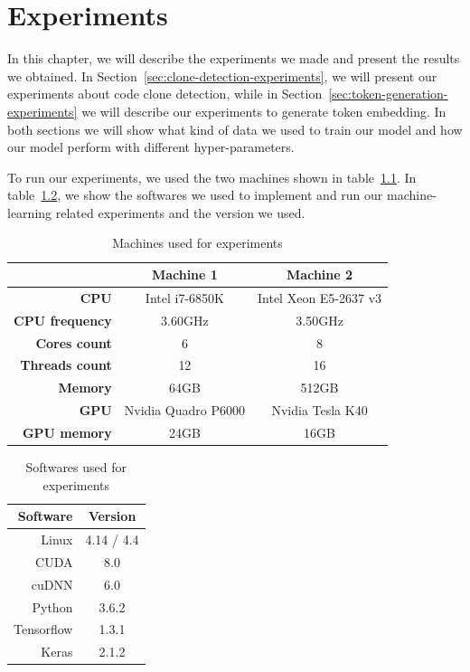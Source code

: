 \chapter{\label{ch:experiments}Experiments}
In this chapter, we will describe the experiments we made and present the
results we obtained. In Section~\ref{sec:clone-detection-experiments}, we will
present our experiments about code clone detection, while in
Section~\ref{sec:token-generation-experiments} we will describe our experiments
to generate token embedding. In both sections we will show what kind of data we
used to train our model and how our model perform with different
hyper-parameters.

To run our experiments, we used the two machines shown in
table~\ref{tab:machine-specs}. In table~\ref{tab:softwares}, we show the
softwares we used to implement and run our machine-learning related experiments
and the version we used.

\begin{table}
  \caption{\label{tab:machine-specs}Machines used for experiments}
  \begin{center}
    \begin{tabular}{r c c}
      \toprule
       & Machine 1 & Machine 2\\
      \toprule
      \textbf{CPU} & Intel i7-6850K & Intel Xeon E5-2637 v3\\
      \textbf{CPU frequency} & 3.60GHz & 3.50GHz\\
      \textbf{Cores count} & 6 & 8\\
      \textbf{Threads count} & 12 & 16\\
      \textbf{Memory} & 64GB & 512GB\\
      \textbf{GPU} & Nvidia Quadro P6000 & Nvidia Tesla K40\\
      \textbf{GPU memory} & 24GB & 16GB\\
      \bottomrule
    \end{tabular}
  \end{center}
\end{table}
%
\begin{table}
  \caption{\label{tab:softwares}Softwares used for experiments}
  \begin{center}
    \begin{tabular}{r c}
      \toprule
       Software & Version\\
      \toprule
      Linux & 4.14 / 4.4\\
      CUDA & 8.0\\
      cuDNN & 6.0\\
      Python & 3.6.2\\
      Tensorflow & 1.3.1\\
      Keras & 2.1.2\\
      \bottomrule
    \end{tabular}
  \end{center}
\end{table}
